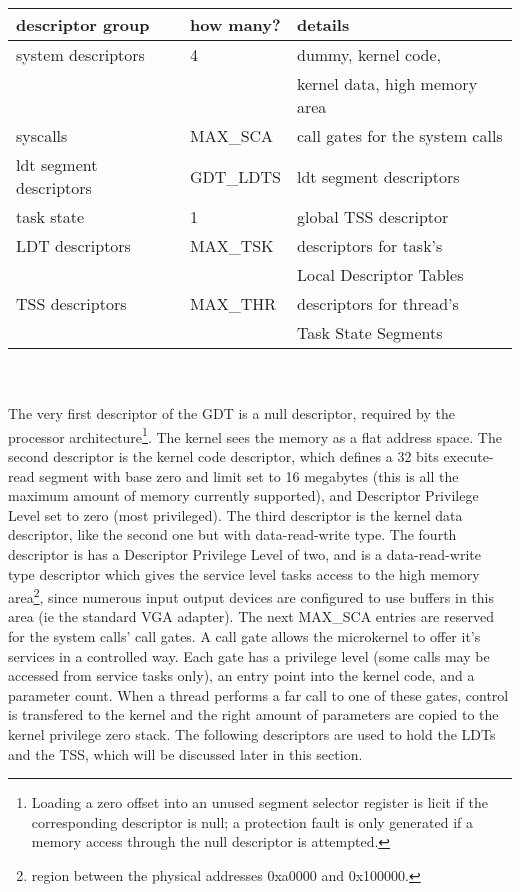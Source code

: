 \documentclass[11pt, letterpaper, twoside, english]{book}
\begin{document}
\begin{tabular}{|l|l|l|}
\hline
\textbf{descriptor group} & \textbf{how many?} & \textbf{details} \\
\hline
system descriptors & 4 & dummy, kernel code, \\
 & & kernel data, high memory area \\
\hline
syscalls & \textsf{MAX\_SCA} & call gates for the system calls \\
\hline
 ldt segment descriptors & \textsf{GDT\_LDTS} & ldt segment descriptors \\
\hline
task state & 1 & global TSS descriptor \\
\hline
LDT descriptors & \textsf{MAX\_TSK} & descriptors for task's \\
 & & Local Descriptor Tables \\
\hline
TSS descriptors & \textsf{MAX\_THR} & descriptors for thread's \\
 & & Task State Segments \\
\hline 
\end{tabular}
\\
\\

The very first descriptor of the GDT is a null descriptor, required by the processor architecture\footnote{Loading a zero offset into an unused segment selector register is licit if the corresponding descriptor is null; a protection fault is only generated if a memory access through the null descriptor is attempted.}. The kernel sees the memory as a flat address space. The second descriptor is the kernel code descriptor, which defines a 32 bits execute-read segment with base zero and limit set to 16 megabytes (this is all the maximum amount of memory currently supported), and Descriptor Privilege Level set to zero (most privileged). The third descriptor is the kernel data descriptor, like the second one but with data-read-write type. The fourth descriptor is has a Descriptor Privilege Level of two, and is a data-read-write type descriptor which gives the service level tasks access to the high memory area\footnote{region between the physical addresses 0xa0000 and 0x100000.}, since numerous input output devices are configured to use buffers in this area (ie the standard VGA adapter). The next \textsf{MAX\_SCA} entries are reserved for the system calls' call gates. A call gate allows the microkernel to offer it's services in a controlled way. Each gate has a privilege level (some calls may be accessed from service tasks only), an entry point into the kernel code, and a parameter count. When a thread performs a far call to one of these gates, control is transfered to the kernel and the right amount of parameters are copied to the kernel privilege zero stack. The following descriptors are used to hold the LDTs and the TSS, which will be discussed later in this section. 
\end{document}
